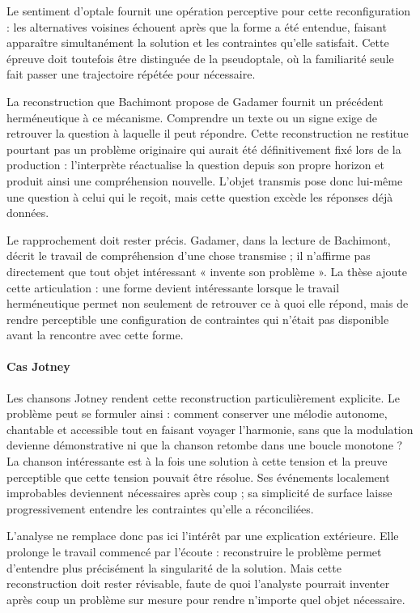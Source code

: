\documentclass[10pt,a4paper]{article}
\begin{document}
Le sentiment d'optale fournit une opération perceptive pour cette reconfiguration : les alternatives voisines échouent après que la forme a été entendue, faisant apparaître simultanément la solution et les contraintes qu'elle satisfait. Cette épreuve doit toutefois être distinguée de la pseudoptale, où la familiarité seule fait passer une trajectoire répétée pour nécessaire.

La reconstruction que Bachimont propose de Gadamer fournit un précédent herméneutique à ce mécanisme. Comprendre un texte ou un signe exige de retrouver la question à laquelle il peut répondre. Cette reconstruction ne restitue pourtant pas un problème originaire qui aurait été définitivement fixé lors de la production : l'interprète réactualise la question depuis son propre horizon et produit ainsi une compréhension nouvelle. L'objet transmis pose donc lui-même une question à celui qui le reçoit, mais cette question excède les réponses déjà données.

Le rapprochement doit rester précis. Gadamer, dans la lecture de Bachimont, décrit le travail de compréhension d'une chose transmise ; il n'affirme pas directement que tout objet intéressant « invente son problème ». La thèse ajoute cette articulation : une forme devient intéressante lorsque le travail herméneutique permet non seulement de retrouver ce à quoi elle répond, mais de rendre perceptible une configuration de contraintes qui n'était pas disponible avant la rencontre avec cette forme.

\paragraph{Cas Jotney}
Les chansons Jotney rendent cette reconstruction particulièrement explicite. Le problème peut se formuler ainsi : comment conserver une mélodie autonome, chantable et accessible tout en faisant voyager l'harmonie, sans que la modulation devienne démonstrative ni que la chanson retombe dans une boucle monotone ? La chanson intéressante est à la fois une solution à cette tension et la preuve perceptible que cette tension pouvait être résolue. Ses événements localement improbables deviennent nécessaires après coup ; sa simplicité de surface laisse progressivement entendre les contraintes qu'elle a réconciliées.

L'analyse ne remplace donc pas ici l'intérêt par une explication extérieure. Elle prolonge le travail commencé par l'écoute : reconstruire le problème permet d'entendre plus précisément la singularité de la solution. Mais cette reconstruction doit rester révisable, faute de quoi l'analyste pourrait inventer après coup un problème sur mesure pour rendre n'importe quel objet nécessaire.
\end{document}
